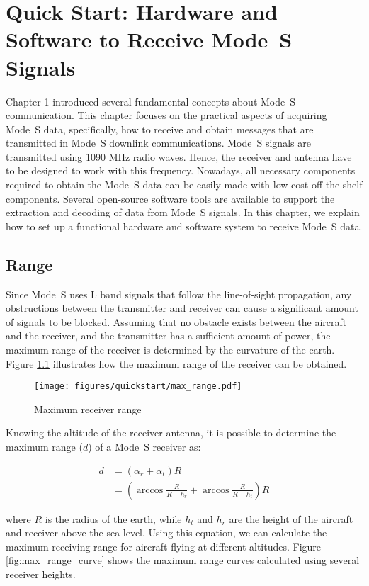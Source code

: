 \chapter{Quick Start: Hardware and Software to Receive Mode~S Signals}
\label{chap:quickstart}

Chapter 1 introduced several fundamental concepts about Mode~S communication. This chapter focuses on the practical aspects of acquiring Mode~S data, specifically, how to receive and obtain messages that are transmitted in Mode~S downlink communications. Mode~S signals are transmitted using 1090 MHz radio waves. Hence, the receiver and antenna have to be designed to work with this frequency. Nowadays, all necessary components required to obtain the Mode~S data can be easily made with low-cost off-the-shelf components. Several open-source software tools are available to support the extraction and decoding of data from Mode~S signals. In this chapter, we explain how to set up a functional hardware and software system to receive Mode~S data.

\section{Range}
Since Mode~S uses L band signals that follow the line-of-sight propagation, any obstructions between the transmitter and receiver can cause a significant amount of signals to be blocked. Assuming that no obstacle exists between the aircraft and the receiver, and the transmitter has a sufficient amount of power, the maximum range of the receiver is determined by the curvature of the earth. Figure \ref{fig:max_range} illustrates how the maximum range of the receiver can be obtained.

\begin{figure}[ht]
\centering
\texttt{[image: figures/quickstart/max\_range.pdf]}
\caption{Maximum receiver range}
\label{fig:max_range}
\end{figure}


Knowing the altitude of the receiver antenna, it is possible to determine the maximum range ($d$) of a Mode~S receiver as:

\begin{align}
  d &= (\alpha_r + \alpha_t) R \\
  & = \left( \arccos \frac{R}{R+h_r} + \arccos \frac{R}{R+h_t} \right) R
\end{align}

\noindent where $R$ is the radius of the earth, while $h_t$ and $h_r$ are the height of the aircraft and receiver above the sea level. Using this equation, we can calculate the maximum receiving range for aircraft flying at different altitudes. Figure \ref{fig:max_range_curve} shows the maximum range curves calculated using several receiver heights.

